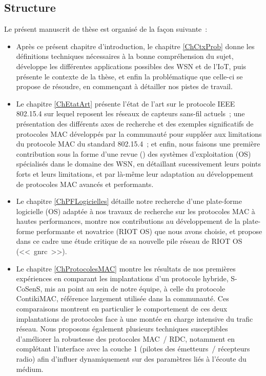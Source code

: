 
\subsection*{Structure}

Le présent manuscrit de thèse est organisé de la façon suivante~:

\begin{itemize}

\item Après ce présent chapitre d'introduction, le chapitre
\vref{ChCtxProb} donne les définitions techniques nécessaires 
à la bonne compréhension du sujet, développe les différentes applications
possibles des WSN et de l'IoT, puis présente le contexte de la thèse,
et enfin la problématique que celle-ci se propose de résoudre, en commençant
à détailler nos pistes de travail.

\item Le chapitre \vref{ChEtatArt} présente l'état de l'art sur le
protocole IEEE 802.15.4 sur lequel reposent les réseaux de capteurs sans-fil
actuels~; une présentation des différents axes de recherche et des exemples
significatifs de protocoles MAC développés par la communauté pour suppléer
aux limitations du protocole MAC du standard 802.15.4~; et enfin, nous
faisons une première contribution sous la forme d'une revue
() des systèmes d'exploitation (OS) spécialisés dans
le domaine des WSN, en détaillant sucessivement leurs points forts et
leurs limitations, et par là-même leur adaptation au développement de
protocoles MAC avancés et performants.

\item Le chapitre \vref{ChPFLogicielles} détaille notre recherche
d'une plate-forme logicielle (OS) adaptée à nos travaux de recherche sur
les protocoles MAC à hautes performances, montre nos contributions au
développement de la plate-forme performante et novatrice (RIOT OS) que
nous avons choisie, et propose dans ce cadre une étude critique de sa
nouvelle pile réseau de RIOT OS (<<~gnrc~>>).

\item Le chapitre \vref{ChProtocolesMAC} montre les résultats de nos
premières expériences en comparant les implantations d'un protocole
hybride, S-CoSenS, mis au point au sein de notre équipe, à celle
du protocole ContikiMAC, référence largement utilisée dans la communauté.
Ces comparaisons montrent en particulier le comportement de ces deux
implantations de protocoles face à une montée en charge intensive
du trafic réseau. Nous proposons également plusieurs techniques
susceptibles d'améliorer la robustesse des protocoles MAC~/ RDC,
notamment en complétant l'interface avec la couche 1 (pilotes
des émetteurs~/ récepteurs radio) afin d'influer dynamiquement
sur des paramètres liés à l'écoute du médium.


\end{itemize}
